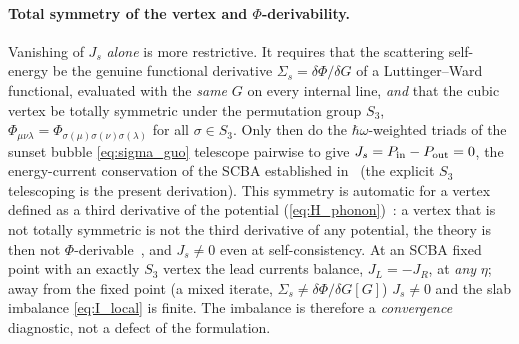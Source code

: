 \paragraph{Total symmetry of the vertex and $\Phi$-derivability.}
Vanishing of $J_s$ \emph{alone} is more restrictive. It requires that the
scattering self-energy be the genuine functional derivative
$\Sigma_s=\delta\Phi/\delta G$ of a Luttinger--Ward functional, evaluated with
the \emph{same} $G$ on every internal line, \emph{and} that the cubic vertex be
totally symmetric under the permutation group $S_3$,
$\Phi_{\mu\nu\lambda}=\Phi_{\sigma(\mu)\sigma(\nu)\sigma(\lambda)}$ for all
$\sigma\in S_3$. Only then do the $\hbar\omega$-weighted triads of the sunset
bubble \cref{eq:sigma_guo} telescope pairwise to give
$J_s=P_{\rm in}-P_{\rm out}=0$, the energy-current conservation of the SCBA
established in~\cite{lu_coupled_2007,wang_quantum_2008} (the explicit $S_3$
telescoping is the present derivation). This
symmetry is automatic for a vertex defined as a third derivative of the
potential (\cref{eq:H_phonon})~\cite{luisier_atomistic_2012}: a vertex that is
not totally symmetric is not the third derivative of any potential, the theory
is then not $\Phi$-derivable~\cite{baym_self-consistent_1962}, and $J_s\neq0$
even at self-consistency. At an SCBA fixed point with an exactly $S_3$ vertex
the lead currents balance, $J_L=-J_R$, at \emph{any} $\eta$; away from the
fixed point (a mixed iterate, $\Sigma_s\neq\delta\Phi/\delta G[G]$) $J_s\neq0$
and the slab imbalance \cref{eq:I_local} is finite. The imbalance is therefore
a \emph{convergence} diagnostic, not a defect of the formulation.

